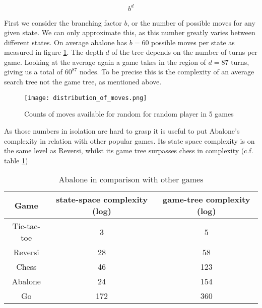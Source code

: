 $$
    b^d
$$

First we consider the branching factor $ b $, or the number of possible moves for any given state. We can only approximate this, as this number greatly varies between different states. On average abalone has $ b = 60 $ possible moves per state as measured in figure \ref{branching_factor}. The depth $ d $ of the tree depends on the number of turns per game. Looking at the average again a game takes in the region of $ d = 87 $ turns, giving us a total of $60^{87}$ nodes. To be precise this is the complexity of an average search tree not the game tree, as mentioned above. \cite{lemmens_constructing_2005}

\begin{figure}
    \centering
    \texttt{[image: distribution\_of\_moves.png]}
    \caption{Counts of moves available for random for random player in 5 games}
    \label{branching_factor}
\end{figure}

As those numbers in isolation are hard to grasp it is useful to put Abalone's complexity in relation with other popular games. Its state space complexity is on the same level as Reversi, whilst its game tree surpasses chess in complexity (c.f. table \ref{complexity_table})

\begin{table}
    \begin{center}
        \begin{tabular}{ | c | c | c | }
            \hline
            Game        & state-space complexity (log) & game-tree complexity (log) \\
            \hline
            Tic-tac-toe & 3                            & 5                          \\
            \hline
            Reversi     & 28                           & 58                         \\
            \hline
            Chess       & 46                           & 123                        \\
            \hline
            Abalone     & 24                           & 154                        \\
            \hline
            Go          & 172                          & 360                        \\
            \hline
        \end{tabular}
    \end{center}
    \caption{Abalone in comparison with other games \cite{chorus_implementing_2009}}
    \label{complexity_table}
\end{table}


